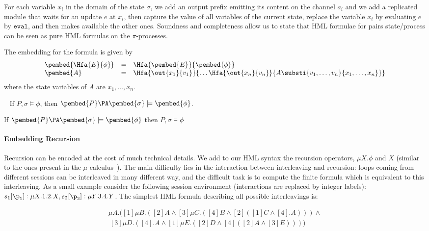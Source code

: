 \NI For each variable $x_i$ in the domain of the state $\sigma$, we add
an output prefix emitting its content on the channel $a_i$ and we add
a replicated module that waits for an update $e$ at $x_i$, then
capture the value of all variables of the current state, replace the
variable $x_i$ by evaluating $e$ by $\mathtt{eval}$, and then makes
available the other ones. Soundness and completeness allow us to state
that HML formulae for pairs state/process can be seen as pure HML
formulas on the $\pi$-processes.



The embedding for the formula is given by 
\[\begin{array}{lll}
\pembed{\Hfa{E}{\phi}} & = & \Hfa{\pembed{E}}{\pembed{\phi}}\\
\pembed{A} & = & \Hfa{\out{x_1}{v_1}}{\dots\Hfa{\out{x_n}{v_n}}
  {A\substi{v_1,\dots,v_n}{x_1,\dots,x_n}}}
  \end{array}\]
  where the state variables of $A$ are $x_1,\dots,x_n$.

\begin{PRO}[Preciseness]
~\label{prop:hml:puresound}
If $P,\sigma \models \phi$, then $\pembed{P} \PA \pembed{\sigma} \models
\pembed{\phi}$.

If $\pembed{P} \PA \pembed{\sigma} \models \pembed{\phi}$ then $P,\sigma
\models \phi$
\end{PRO}



\paragraph{Embedding Recursion}

Recursion can be encoded at the cost of much technical details. We add
to our HML syntax the recursion operators, $\mu X.\phi$ and $X$
(similar to the ones present in the
$\mu$-calculus~\cite{DBLP:journals/tcs/Dam94}).
The main difficulty lies in the interaction between interleaving and
recursion: loops coming from different sessions can be interleaved in
many different way, and the difficult task is to compute the finite
formula which is equivalent to this interleaving.
As a small example consider the following session environment
(interactions are replaced by integer labels): $s_1[\p_1]: \mu
X.1.2.X, s_2[\p_2]: \mu Y.3.4.Y$. The simplest HML formula describing
all possible interleavings is: 

{ $$\begin{array}{l} \mu A.([1]\mu B.([2]A \land [3]\mu
C.([4]B \land [2]([1]C \land [4].A) )) \land  \\
 ~[3]\mu D.([4].A \land
[1]\mu E.([2]D \land [4]([2]A \land [3]E))))
  \end{array}$$}







